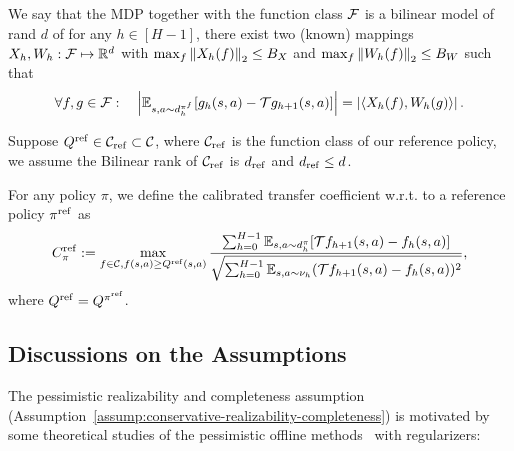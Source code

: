 \begin{definition}
\label{def:bilinear-model}
We say that the MDP together with the function class $\mathcal F$ is a bilinear model of rand $d$ of for any $h\in [H-1]$, there exist two (known) mappings $X_h,W_h:\mathcal F\mapsto \mathbb R^d$ with $\max_f\left\| X_h(f) \right\|_{2}\leq B_X$ and $\max_f\left\| W_h(f) \right\|_{2}\leq B_W$ such that 
\begin{equation}
    \label{eq:bilinear-model}
    \forall f, g \in \mathcal F:\quad \left| \mathbb E_{s,a\sim d_h^{\pi^f}} [g_h(s,a)-\mathcal Tg_{h+1}(s,a)] \right| = \left| \left\langle X_h(f), W_h(g) \right\rangle \right|.
\end{equation}
\end{definition}

\begin{assumption}
\label{assump:conservative-bilinear-rank}
Suppose $Q^{\mathrm{ref}}\in\mathcal C_\mathrm{ref}\subset\mathcal C$, where $\mathcal C_\mathrm{ref}$ is the function class of our reference policy, we assume the Bilinear rank of $\mathcal C_\mathrm{ref}$ is $d_\mathrm{ref}$ and $d_\mathrm{ref}\leq d$.
\end{assumption}


\begin{definition}
\label{def:bellman-error-coeff-ref}
For any policy $\pi$, we define the calibrated transfer coefficient w.r.t. to a reference policy $\pi^\mathrm{ref}$ as 
\begin{equation}
    C^\mathrm{ref}_\pi:=\max_{f\in \mathcal C,f(s,a)\geq Q^\mathrm{ref}(s,a)}\frac{\sum_{h=0}^{H-1}\mathbb E_{s,a\sim d_h^\pi}[\mathcal T f_{h+1}(s,a)-f_h(s,a)]}{\sqrt{\sum_{h=0}^{H-1}\mathbb E_{s,a\sim \nu_h}(\mathcal T f_{h+1}(s,a)-f_h(s,a))^2}},
\end{equation}
where $Q^\mathrm{ref} = Q^{\pi^\mathrm{ref}}$.
\end{definition}

\subsection{Discussions on the Assumptions}
The pessimistic realizability and completeness assumption (Assumption~\ref{assump:conservative-realizability-completeness}) is motivated by some theoretical studies of the pessimistic offline methods~\cite{xie2021bellman,cheng2022adversarially} with regularizers:

